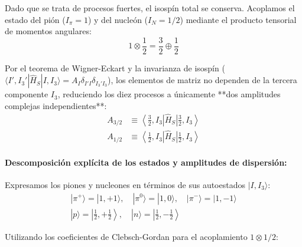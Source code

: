 Dado que se trata de procesos fuertes, el isospín total se conserva. Acoplamos el estado del pión ($I_\pi = 1$) y del nucleón ($I_N = 1/2$) mediante el producto tensorial de momentos angulares:
\begin{equation}
    1 \otimes \frac{1}{2} = \frac{3}{2} \oplus \frac{1}{2}
\end{equation}

Por el teorema de Wigner-Eckart y la invarianza de isospín ($\langle I', I_3' | \hat{H}_S | I, I_3 \rangle = A_I \delta_{I'I} \delta_{I_3'I_3}$), los elementos de matriz no dependen de la tercera componente $I_3$, reduciendo los diez procesos a únicamente **dos amplitudes complejas independientes**:
\begin{align}
    A_{3/2} &\equiv \left\langle \frac{3}{2}, I_3 \right| \hat{H}_S \left| \frac{3}{2}, I_3 \right\rangle \\
    A_{1/2} &\equiv \left\langle \frac{1}{2}, I_3 \right| \hat{H}_S \left| \frac{1}{2}, I_3 \right\rangle
\end{align}

\paragraph{Descomposición explícita de los estados y amplitudes de dispersión:}

Expresamos los piones y nucleones en términos de sus autoestados $|I, I_3\rangle$:
\begin{align}
    |\pi^+\rangle = |1, +1\rangle, \quad |\pi^0\rangle = |1, 0\rangle, \quad |\pi^-\rangle = |1, -1\rangle \\
    |p\rangle = \left|\frac{1}{2}, +\frac{1}{2}\right\rangle, \quad |n\rangle = \left|\frac{1}{2}, -\frac{1}{2}\right\rangle
\end{align}

Utilizando los coeficientes de Clebsch-Gordan para el acoplamiento $1 \otimes 1/2$:

